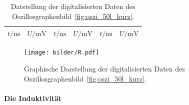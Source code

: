 \begin{table}[hb]
  \centering
  \begin{tabular}{cc|cc|cc}
    \midrule
    \midrule
    $t / \si{\nano\second}$ & $U / \si{\milli\volt}$ &
    $t / \si{\nano\second}$ & $U / \si{\milli\volt}$ &
    $t / \si{\nano\second}$ & $U / \si{\milli\volt}$ \\
    \midrule
    
    \midrule
    \midrule
  \end{tabular}
  \caption{Datstellung der digitalisierten Daten des
    Oszillosgraphenbild~\ref{fig:oszi_50l_kurz}.}
  \label{tab:R_Daten}
\end{table}
\begin{figure}[hb]
  \centering
  \texttt{[image: bilder/R.pdf]}
  \caption{Graphische Darstellung der digitalisierten Daten des
    Oszillosgraphenbild~\ref{fig:oszi_50l_kurz}.}
\label{fig:R_Daten}
\end{figure}

\clearpage
\paragraph{Die Induktivität}
\label{par:die_induktivitaet}

